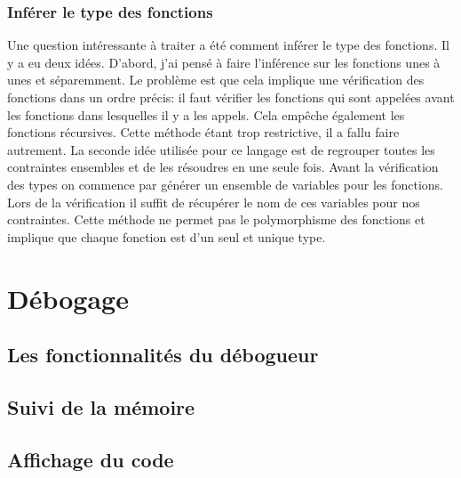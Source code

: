 \documentclass{article}
\begin{document}
\subsubsection{Inférer le type des fonctions}
Une question intéressante à traiter a été comment inférer le type des 
fonctions. Il y a eu deux idées. D'abord, j'ai pensé à faire l'inférence 
sur les fonctions unes à unes et séparemment. Le problème est que cela 
implique une vérification des fonctions dans un ordre précis: il faut 
vérifier les fonctions qui sont appelées avant les fonctions dans 
lesquelles il y a les appels. Cela empêche également les fonctions 
récursives. Cette méthode étant trop restrictive, il a fallu faire 
autrement. La seconde idée utilisée pour ce langage est de regrouper 
toutes les contraintes ensembles et de les résoudres en une seule fois.
Avant la vérification des types on commence par générer un ensemble de 
variables pour les fonctions. Lors de la vérification il suffit de récupérer 
le nom de ces variables pour nos contraintes. Cette méthode ne permet pas le 
polymorphisme des fonctions et implique que chaque fonction est d'un seul 
et unique type.

\section{Débogage}

\subsection{Les fonctionnalités du débogueur}

\subsection{Suivi de la mémoire}

\subsection{Affichage du code}
\end{document}
